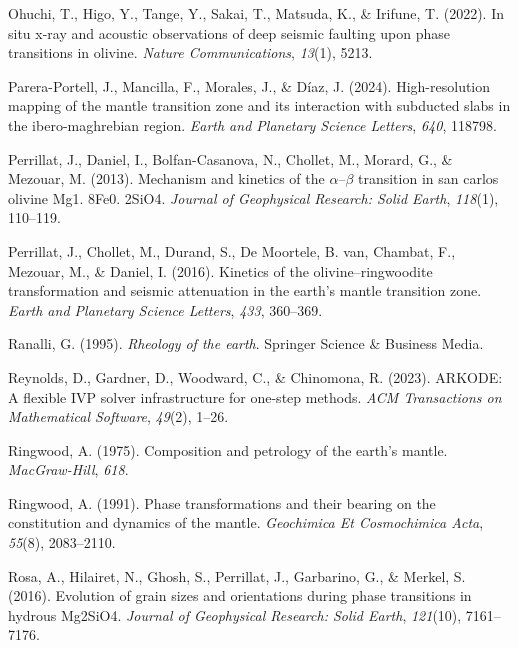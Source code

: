 \documentclass[draft,linenumbers]{agujournal2019}
\newlength{\cslhangindent}
\newenvironment{CSLReferences}[2]
 {\begin{list}{}{
  \setlength{\itemindent}{0pt}
  \setlength{\leftmargin}{0pt}
  \setlength{\parsep}{0pt}
  \ifodd #1
   \setlength{\leftmargin}{\cslhangindent}
   \setlength{\itemindent}{-\cslhangindent}
  \fi
  \setlength{\itemsep}{#2\baselineskip}
  }
  \item\relax}
 {\end{list}}
\begin{document}
\begin{CSLReferences}{1}{0}
Ohuchi, T., Higo, Y., Tange, Y., Sakai, T., Matsuda, K., \& Irifune, T.
(2022). In situ x-ray and acoustic observations of deep seismic faulting
upon phase transitions in olivine. \emph{Nature Communications},
\emph{13}(1), 5213.

Parera-Portell, J., Mancilla, F., Morales, J., \& Díaz, J. (2024).
High-resolution mapping of the mantle transition zone and its
interaction with subducted slabs in the ibero-maghrebian region.
\emph{Earth and Planetary Science Letters}, \emph{640}, 118798.

Perrillat, J., Daniel, I., Bolfan-Casanova, N., Chollet, M., Morard, G.,
\& Mezouar, M. (2013). Mechanism and kinetics of the
\(\alpha\)--\(\beta\) transition in san carlos olivine Mg1. 8Fe0. 2SiO4.
\emph{Journal of Geophysical Research: Solid Earth}, \emph{118}(1),
110--119.

Perrillat, J., Chollet, M., Durand, S., De Moortele, B. van, Chambat,
F., Mezouar, M., \& Daniel, I. (2016). Kinetics of the
olivine--ringwoodite transformation and seismic attenuation in the
earth's mantle transition zone. \emph{Earth and Planetary Science
Letters}, \emph{433}, 360--369.

Ranalli, G. (1995). \emph{Rheology of the earth}. Springer Science \&
Business Media.

Reynolds, D., Gardner, D., Woodward, C., \& Chinomona, R. (2023).
ARKODE: A flexible IVP solver infrastructure for one-step methods.
\emph{ACM Transactions on Mathematical Software}, \emph{49}(2), 1--26.

Ringwood, A. (1975). Composition and petrology of the earth's mantle.
\emph{MacGraw-Hill}, \emph{618}.

Ringwood, A. (1991). Phase transformations and their bearing on the
constitution and dynamics of the mantle. \emph{Geochimica Et
Cosmochimica Acta}, \emph{55}(8), 2083--2110.

Rosa, A., Hilairet, N., Ghosh, S., Perrillat, J., Garbarino, G., \&
Merkel, S. (2016). Evolution of grain sizes and orientations during
phase transitions in hydrous Mg2SiO4. \emph{Journal of Geophysical
Research: Solid Earth}, \emph{121}(10), 7161--7176.


\end{CSLReferences}
\end{document}
